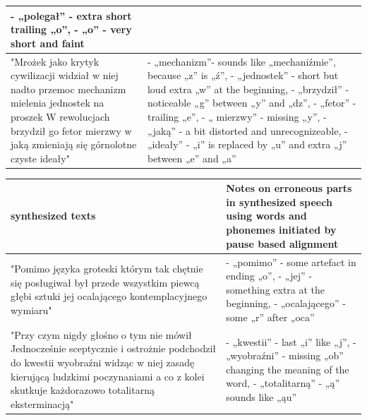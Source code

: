 \documentclass[12pt,a4paper,english]{article}
\begin{document}
\begin{center}
\begin{tabular}{| p{8cm} | p{8cm} |}
- „polegał” - extra short trailing „o”, \newline
- „o” - very short and faint
\\ \hline
"Mrożek jako krytyk cywilizacji widział w niej nadto przemoc mechanizm mielenia jednostek na proszek W rewolucjach brzydził go fetor mierzwy w jaką zmieniają się górnolotne czyste ideały" &
- „mechanizm”- sounds like „mechaniźmie”, because „z” is „ź”, \newline
- „jednostek” - short but loud extra „w” at the beginning, \newline
- „brzydził” - noticeable „g” between „y” and „dz”, \newline
- „fetor” - trailing „e”, \newline
- „ mierzwy” - missing „y”, \newline
- „jaką” - a bit distorted and unrecognizeable, \newline
- „ideały” - „i” is replaced by „u” and extra „j” between „e” and „a”
\\ \hline
\end{tabular}
\end{center}

\newpage

\begin{center}
\begin{tabular}{| p{8cm} | p{8cm} |}
\hline
\cellcolor[gray]{0.8}
synthesized texts &
\cellcolor[gray]{0.8}
Notes on erroneous parts in synthesized speech using words and phonemes initiated by pause based alignment
\\ \hline
"Pomimo języka groteski którym tak chętnie się posługiwał był przede wszystkim piewcą głębi sztuki jej ocalającego kontemplacyjnego wymiaru" &
- „pomimo” - some artefact in ending „o”, \newline
- „jej” - something extra at the beginning, \newline
- „ocalającego” - some „r” after „oca”

\\ \hline
"Przy czym nigdy głośno o tym nie mówił Jednocześnie sceptycznie i ostrożnie podchodził do kwestii wyobraźni widząc w niej zasadę kierującą ludzkimi poczynaniami a co z kolei skutkuje każdorazowo totalitarną eksterminacją" &
- „kwestii” - last „i” like „j”, \newline
- „wyobraźni” - missing „ob” changing the meaning of the word, \newline
- „totalitarną” - „ą” sounds like „ąu”

\\ \hline
\end{tabular}
\end{center}
\end{document}
